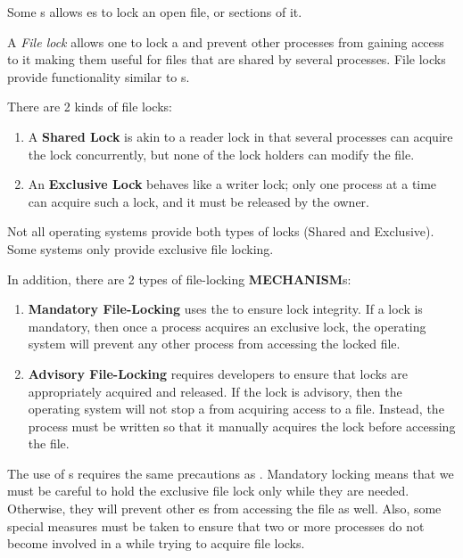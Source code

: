 Some s allows es to lock an open file, or sections of it.
\begin{definition}\label{def:File_Lock}
  A \emph{File lock} allows one  to lock a  and prevent other processes from gaining access to it making them useful for files that are shared by several processes.
  File locks provide functionality similar to s.

  There are 2 kinds of file locks:
  \begin{enumerate}[noitemsep]
  \item A \textbf{Shared Lock} is akin to a reader lock in that several processes can acquire the lock concurrently, but none of the lock holders can modify the file.
  \item An \textbf{Exclusive Lock} behaves like a writer lock; only one process at a time can acquire such a lock, and it must be released by the owner.
  \end{enumerate}

  \begin{remark}
    Not all operating systems provide both types of locks (Shared and Exclusive).
    Some systems only provide exclusive file locking.
  \end{remark}

  In addition, there are 2 types of file-locking \textbf{MECHANISM}s:
  \begin{enumerate}[noitemsep]
  \item \textbf{Mandatory File-Locking} uses the  to ensure lock integrity.
    If a lock is mandatory, then once a process acquires an exclusive lock, the operating system will prevent any other process from accessing the locked file.
  \item \textbf{Advisory File-Locking} requires developers to ensure that locks are appropriately acquired and released.
    If the lock is advisory, then the operating system will not stop a  from acquiring access to a file.
    Instead, the process must be written so that it manually acquires the lock before accessing the file.
  \end{enumerate}

  \begin{remark}
    The use of s requires the same precautions as  .
    Mandatory locking means that we must be careful to hold the exclusive file lock only while they are needed.
    Otherwise, they will prevent other es from accessing the file as well.
    Also, some special measures must be taken to ensure that two or more processes do not become involved in a  while trying to acquire file locks.
  \end{remark}
\end{definition}


